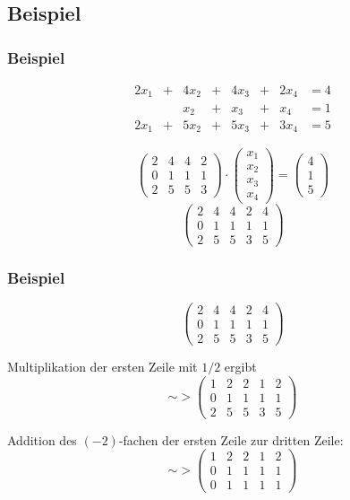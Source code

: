\subsection{Beispiel}
\makeSectionDividerPage
%
\begin{frame}\frametitle{Beispiel}
	
	$$
		\begin{array}{rcrcrcrcl}
			2x_1	&+	&4x_2	&+	&4x_3	&+	&2x_4	&= 4\\
				&	&x_2		&+	&x_3		&+	&x_4       	&= 1\\
			2x_1	&+	&5x_2	&+	&5x_3	&+	&3x_4 	&= 5	
		\end{array}
	$$
	
	\pause
	\vspace{10mm}
	$$
		\begin{pmatrix}
			2 & 4 & 4 & 2\\
			0 & 1 & 1 & 1\\
			2 & 5 & 5 & 3
		\end{pmatrix}
		\cdot 
		\begin{pmatrix}
			x_1\\
			x_2\\
			x_3\\
			x_4
		\end{pmatrix}
		=
		\begin{pmatrix}
			4\\ 
			1\\
			5
		\end{pmatrix}
	$$
	\pause
	\vspace{10mm}	
	$$
	\left(
	\begin{array}{cccc|c}
		2 & 4 & 4 & 2 & 4\\
		0 & 1 & 1 & 1 & 1\\
		2 & 5 & 5 & 3 & 5
	\end{array}
	\right)
	$$
	
\end{frame}
%
%
\begin{frame}\frametitle{Beispiel}

	$$
		\left(
		\begin{array}{cccc|c}
			2 & 4 & 4 & 2 & 4\\
			0 & 1 & 1 & 1 & 1\\
			2 & 5 & 5 & 3 & 5
		\end{array}
		\right)
	$$
	
	\pause
	\vspace{5mm}
	Multiplikation der ersten Zeile mit $1/2$ ergibt
	$$
		\sim>
		\left(
		\begin{array}{cccc|c}
			1 & 2 & 2 & 1 & 2\\
			0 & 1 & 1 & 1 & 1\\
			2 & 5 & 5 & 3 & 5
		\end{array}
		\right)
	$$
	
	\pause
	\vspace{5mm}
	Addition des $(-2)$-fachen der ersten Zeile zur dritten Zeile:
	$$
		\sim>
		\left(
		\begin{array}{cccc|c}
			1 & 2 & 2 & 1 & 2\\
			0 & 1 & 1 & 1 & 1\\
			0 & 1 & 1 & 1 & 1
		\end{array}
		\right)
	$$
	
\end{frame}
